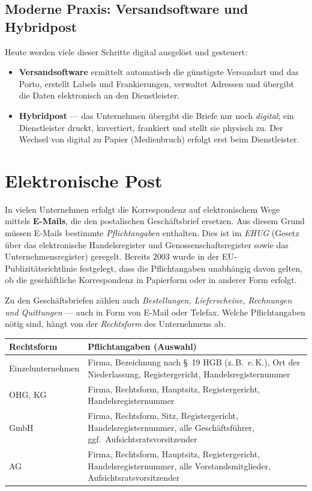 \documentclass[11pt, a4paper]{article}
\begin{document}
\subsection{Moderne Praxis: Versandsoftware und Hybridpost}

Heute werden viele dieser Schritte digital ausgelöst und gesteuert:

\begin{itemize}
  \item \textbf{Versandsoftware} ermittelt automatisch die günstigste Versandart und das Porto, erstellt Labels und Frankierungen, verwaltet Adressen und übergibt die Daten elektronisch an den Dienstleister.
  \item \textbf{Hybridpost} --- das Unternehmen übergibt die Briefe nur noch \emph{digital}; ein Dienstleister druckt, kuvertiert, frankiert und stellt sie physisch zu. Der Wechsel von digital zu Papier (Medienbruch) erfolgt erst beim Dienstleister.
\end{itemize}

\section{Elektronische Post}

In vielen Unternehmen erfolgt die Korrespondenz auf elektronischem Wege mittels
\textbf{E-Mails}, die den postalischen Geschäftsbrief ersetzen. Aus diesem Grund müssen
E-Mails bestimmte \emph{Pflichtangaben} enthalten. Dies ist im \emph{EHUG} (Gesetz über
das elektronische Handelsregister und Genossenschaftsregister sowie das
Unternehmensregister) geregelt. Bereits 2003 wurde in der EU-Publizitätsrichtlinie
festgelegt, dass die Pflichtangaben unabhängig davon gelten, ob die geschäftliche
Korrespondenz in Papierform oder in anderer Form erfolgt.

Zu den Geschäftsbriefen zählen auch \emph{Bestellungen, Lieferscheine, Rechnungen und
Quittungen} --- auch in Form von E-Mail oder Telefax. Welche Pflichtangaben nötig sind,
hängt von der \emph{Rechtsform} des Unternehmens ab.

\begin{center}
\begin{tabular}{p{3cm} p{9cm}}
\toprule
\textbf{Rechtsform} & \textbf{Pflichtangaben (Auswahl)}\\
\midrule
Einzelunternehmen & Firma, Bezeichnung nach \S~19 HGB (z.\,B.\ e.\,K.), Ort der Niederlassung, Registergericht, Handelsregisternummer\\
OHG, KG & Firma, Rechtsform, Hauptsitz, Registergericht, Handelsregisternummer\\
GmbH & Firma, Rechtsform, Sitz, Registergericht, Handelsregisternummer, alle Geschäftsführer, ggf.\ Aufsichtsratsvorsitzender\\
AG & Firma, Rechtsform, Hauptsitz, Registergericht, Handelsregisternummer, alle Vorstandsmitglieder, Aufsichtsratsvorsitzender\\
\bottomrule
\end{tabular}
\end{center}
\end{document}
